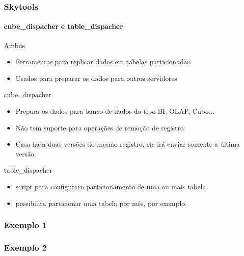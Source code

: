 \documentclass{beamer}
\begin{document}
\begin{frame}
    \frametitle{\textbf{Skytools}}
    \framesubtitle{cube\_dispacher e table\_dispacher}
      \begin{block}{Ambos}
         \begin{itemize}
           \item Ferramentas para replicar dados em tabelas particionadas.
	   \item Usados para preparar os dados para outros servidores
         \end{itemize}
       \end{block}

      \begin{block}{cube\_dispacher}
         \begin{itemize}
	   \item Prepara os dados para banco de dados do tipo BI, OLAP, Cubo...
	   \item Não tem suporte para operações de remoção de registro
	   \item Caso haja duas versões do mesmo registro, ele irá enviar somente a última versão.
	 \end{itemize}
      \end{block}

      \begin{block}{table\_dispacher}
        \begin{itemize}
	  \item script para configuraro particionamento de uma ou mais tabela.
	  \item possibilita particionar uma tabela por mês, por exemplo.
	\end{itemize}
      \end{block}
\end{frame}



\begin{frame}
    \frametitle{\textbf{Exemplo 1}}
     \begin{center}
       \par
      \end{center}


\end{frame}

\begin{frame}
    \frametitle{\textbf{Exemplo 2}}
     \begin{center}
       \par
      \end{center}


\end{frame}
\end{document}
